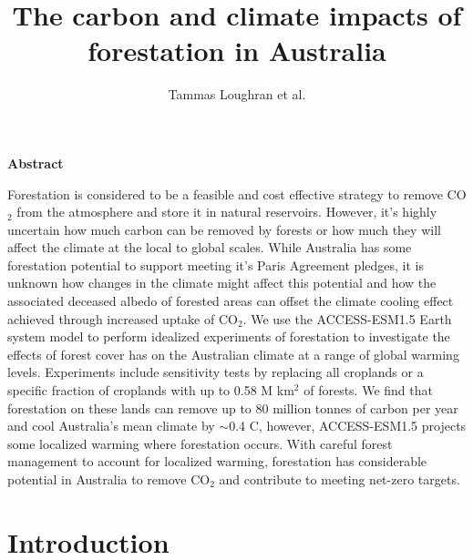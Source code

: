\documentclass[]{article}
\title{The carbon and climate impacts of forestation in Australia}
\author{Tammas Loughran et al.}
\begin{document}
\maketitle

\begin{center}
    \Large
    \vspace{0.9cm}
    \textbf{Abstract}
\end{center}

Forestation is considered to be a feasible and cost effective strategy to remove CO$_2$ from the atmosphere and store it in natural reservoirs.
However, it's highly uncertain how much carbon can be removed by forests or how much they will affect the climate at the local to global scales.
While Australia has some forestation potential to support meeting it's Paris Agreement pledges, it is unknown how changes in the climate might affect this potential and how the associated deceased albedo of forested areas can offset the climate cooling effect achieved through increased uptake of CO$_2$.
We use the ACCESS-ESM1.5 Earth system model to perform idealized experiments of forestation to investigate the effects of forest cover has on the Australian climate at a range of global warming levels.
Experiments include sensitivity tests by replacing all croplands or a specific fraction of croplands with up to 0.58 M km$^2$ of forests.
We find that forestation on these lands can remove up to 80 million tonnes of carbon per year and cool Australia's mean climate by $\sim$0.4 \textdegree{}C, however, ACCESS-ESM1.5 projects some localized warming where forestation occurs.
With careful forest management to account for localized warming, forestation has considerable potential in Australia to remove CO$_2$ and contribute to meeting net-zero targets.

\raggedright
\parindent=0.35in %

\section{Introduction}
\end{document}
